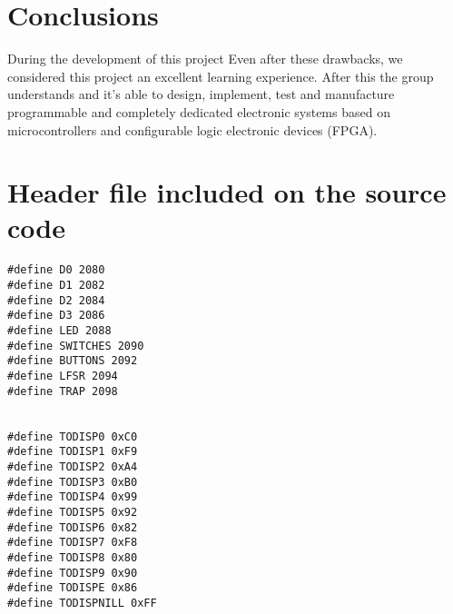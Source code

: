 \section{Conclusions}
\label{sec:progex}
During the development of this project
\noindent Even after these drawbacks, we considered this project an excellent learning experience. 
After this the group understands and it's able to design, implement, test and manufacture programmable and 
completely dedicated electronic systems based on microcontrollers and configurable logic electronic 
devices (FPGA).

\clearpage
\appendix
\appendixpage
\section{Header file included on the source code}
\begin{lstlisting}[style=CStyle]
#define D0 2080
#define D1 2082
#define D2 2084
#define D3 2086
#define LED 2088
#define SWITCHES 2090
#define BUTTONS 2092
#define LFSR 2094
#define TRAP 2098


#define TODISP0 0xC0
#define TODISP1 0xF9
#define TODISP2 0xA4
#define TODISP3 0xB0
#define TODISP4 0x99
#define TODISP5 0x92
#define TODISP6 0x82
#define TODISP7 0xF8
#define TODISP8 0x80
#define TODISP9 0x90
#define TODISPE 0x86
#define TODISPNILL 0xFF
\end{lstlisting}


